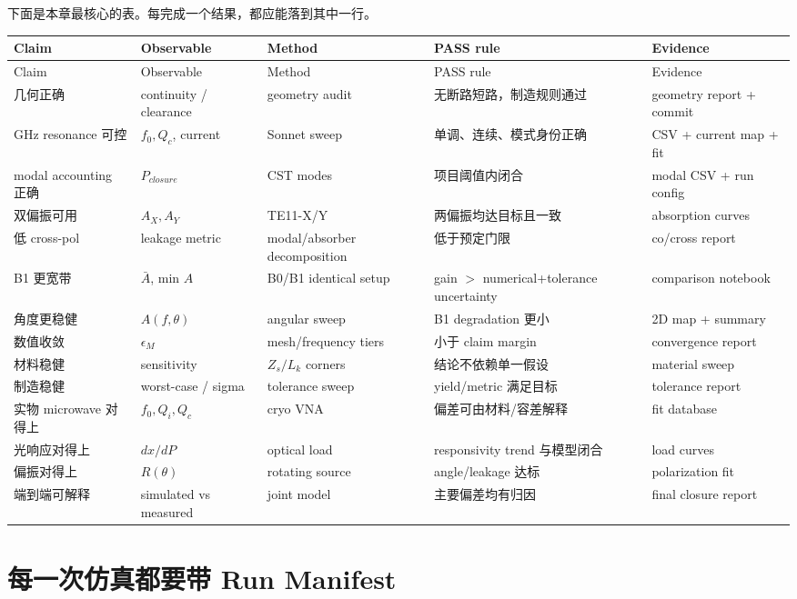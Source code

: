 \documentclass[11pt,a4paper,openany]{ctexrep}
\begin{document}
下面是本章最核心的表。每完成一个结果，都应能落到其中一行。

\small
\begin{longtable}{p{2.3cm}p{3.0cm}p{2.6cm}p{3.0cm}p{3.0cm}}
\toprule
Claim & Observable & Method & PASS rule & Evidence \\
\midrule
\endfirsthead
\toprule
Claim & Observable & Method & PASS rule & Evidence \\
\midrule
\endhead
几何正确 & continuity / clearance & geometry audit & 无断路短路，制造规则通过 & geometry report + commit \\
GHz resonance 可控 & $f_0,Q_c$, current & Sonnet sweep & 单调、连续、模式身份正确 & CSV + current map + fit \\
modal accounting 正确 & $P_{closure}$ & CST modes & 项目阈值内闭合 & modal CSV + run config \\
双偏振可用 & $A_X,A_Y$ & TE11-X/Y & 两偏振均达目标且一致 & absorption curves \\
低 cross-pol & leakage metric & modal/absorber decomposition & 低于预定门限 & co/cross report \\
B1 更宽带 & $\bar A$, min $A$ & B0/B1 identical setup & gain $>$ numerical+tolerance uncertainty & comparison notebook \\
角度更稳健 & $A(f,\theta)$ & angular sweep & B1 degradation 更小 & 2D map + summary \\
数值收敛 & $\epsilon_M$ & mesh/frequency tiers & 小于 claim margin & convergence report \\
材料稳健 & sensitivity & $Z_s/L_k$ corners & 结论不依赖单一假设 & material sweep \\
制造稳健 & worst-case / sigma & tolerance sweep & yield/metric 满足目标 & tolerance report \\
实物 microwave 对得上 & $f_0,Q_i,Q_c$ & cryo VNA & 偏差可由材料/容差解释 & fit database \\
光响应对得上 & $dx/dP$ & optical load & responsivity trend 与模型闭合 & load curves \\
偏振对得上 & $R(\theta)$ & rotating source & angle/leakage 达标 & polarization fit \\
端到端可解释 & simulated vs measured & joint model & 主要偏差均有归因 & final closure report \\
\bottomrule
\end{longtable}
\normalsize

\section{每一次仿真都要带 Run Manifest}
\end{document}
